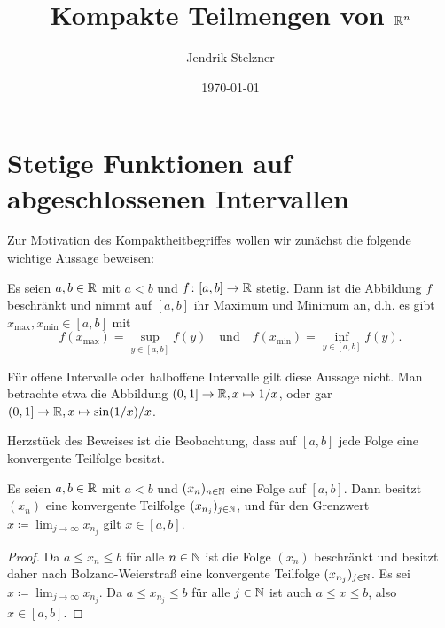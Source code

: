 \documentclass[a4paper,10pt]{article}
\title{Kompakte Teilmengen von $\mathbb{R}^n$}
\author{Jendrik Stelzner}
\date{\today}
\begin{document}
\maketitle

\tableofcontents





\section{Stetige Funktionen auf abgeschlossenen Intervallen}


Zur Motivation des Kompaktheitbegriffes wollen wir zunächst die folgende wichtige Aussage beweisen:


\begin{lem}\label{lem: stetig auf Intervall}
 Es seien $a,b \in \mathbb{R}$ mit $a < b$ und $f \colon [a,b] \to \mathbb{R}$ stetig. Dann ist die Abbildung $f$ beschränkt und nimmt auf $[a,b]$ ihr Maximum und Minimum an, d.h. es gibt $x_{\text{max}}, x_{\text{min}} \in [a,b]$ mit
 \[
  f(x_{\text{max}}) = \sup_{y \in [a,b]} f(y)
  \quad
  \text{und}
  \quad
  f(x_{\text{min}}) = \inf_{y \in [a,b]} f(y).
 \]
\end{lem}


Für offene Intervalle oder halboffene Intervalle gilt diese Aussage nicht. Man betrachte etwa die Abbildung $(0,1] \to \mathbb{R}, x \mapsto 1/x$, oder gar $(0,1] \to \mathbb{R}, x \mapsto \sin(1/x)/x$.


Herzstück des Beweises ist die Beobachtung, dass auf $[a,b]$ jede Folge eine konvergente Teilfolge besitzt.


\begin{lem}\label{lem: Intervall ist kompakt}
 Es seien $a,b \in \mathbb{R}$ mit $a < b$ und $(x_n)_{n \in \mathbb{N}}$ eine Folge auf $[a,b]$. Dann besitzt $(x_n)$ eine konvergente Teilfolge $(x_{n_j})_{j \in \mathbb{N}}$, und für den Grenzwert $x \coloneqq \lim_{j \to \infty} x_{n_j}$ gilt $x \in [a,b]$.
\end{lem}
\begin{proof}
 Da $a \leq x_n \leq b$ für alle $n \in \mathbb{N}$ ist die Folge $(x_n)$ beschränkt und besitzt daher nach Bolzano-Weierstraß eine konvergente Teilfolge $(x_{n_j})_{j \in \mathbb{N}}$. Es sei $x \coloneqq \lim_{j \to \infty} x_{n_j}$. Da $a \leq x_{n_j} \leq b$ für alle $j \in \mathbb{N}$ ist auch $a \leq x \leq b$, also $x \in [a,b]$.
\end{proof}
\end{document}
